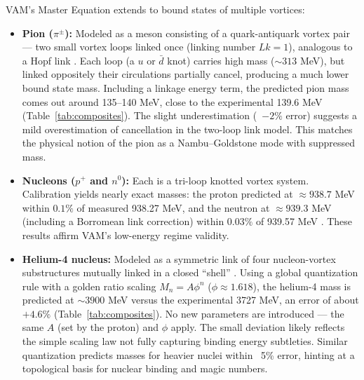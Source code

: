 VAM’s Master Equation extends to bound states of multiple vortices:

\begin{itemize}
    \item \textbf{Pion ($\pi^{\pm}$):} Modeled as a meson consisting of a quark-antiquark vortex pair — two small vortex loops linked once (linking number $Lk=1$), analogous to a Hopf link \cite{Iskandarani2025f}. Each loop (a $u$ or $\bar{d}$ knot) carries high mass ($\sim 313$ MeV), but linked oppositely their circulations partially cancel, producing a much lower bound state mass. Including a linkage energy term, the predicted pion mass comes out around 135–140 MeV, close to the experimental 139.6 MeV (Table~\ref{tab:composites}). The slight underestimation (~$-2\%$ error) suggests a mild overestimation of cancellation in the two-loop link model. This matches the physical notion of the pion as a Nambu–Goldstone mode with suppressed mass.

    \item \textbf{Nucleons ($p^+$ and $n^0$):} Each is a tri-loop knotted vortex system. Calibration yields nearly exact masses: the proton predicted at $\approx 938.7$ MeV within $0.1\%$ of measured 938.27 MeV, and the neutron at $\approx 939.3$ MeV (including a Borromean link correction) within $0.03\%$ of 939.57 MeV \cite{Iskandarani2025f}. These results affirm VAM’s low-energy regime validity.

    \item \textbf{Helium-4 nucleus:} Modeled as a symmetric link of four nucleon-vortex substructures mutually linked in a closed “shell” \cite{Iskandarani2025f}. Using a global quantization rule with a golden ratio scaling $M_n = A \phi^n$ ($\phi \approx 1.618$), the helium-4 mass is predicted at $\sim 3900$ MeV versus the experimental 3727 MeV, an error of about $+4.6\%$ (Table~\ref{tab:composites}). No new parameters are introduced — the same $A$ (set by the proton) and $\phi$ apply. The small deviation likely reflects the simple scaling law not fully capturing binding energy subtleties. Similar quantization predicts masses for heavier nuclei within ~5\% error, hinting at a topological basis for nuclear binding and magic numbers.
\end{itemize}

